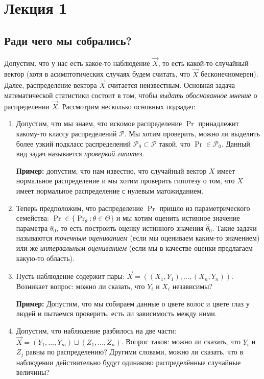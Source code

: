 \section{Лекция 1}
\subsection{Ради чего мы собрались?}
Допустим, что у нас есть какое-то наблюдение $\vec{X}$, то есть какой-то случайный вектор (хотя в асимптотических случаях будем считать, что $\vec{X}$ бесконечномерен). 
Далее, распределение вектора $\vec{X}$ считается неизвестным.
Основная задача математической статистики состоит в том, чтобы \emph{выдать обоснованное мнение} о распределении $\vec{X}$.
Рассмотрим несколько основных подзадач:
\begin{enumerate}[label=(\alph*)]
	\item Допустим, что мы знаем, что искомое распределение $\Pr$ принадлежит какому-то классу распределений $\mathcal{P}$.
	Мы хотим проверить, можно ли выделить более узкий подкласс распределений $\mathcal{P}_{0} \subset \mathcal{P}$ такой, что $\Pr \in \mathcal{P}_{0}$.
	Данный вид задач называется \emph{проверкой гипотез}.
	
	\textbf{Пример:} допустим, что нам известно, что случайный вектор $X$ имеет нормальное распределение и мы хотим проверить гипотезу о том, что $X$ имеет нормальное распределение с нулевым матожиданием.
	
	\item Теперь предположим, что распределение $\Pr$ пришло из параметрического семейства: $\Pr \in \{\Pr_{\theta}\colon \theta \in \Theta\}$ и мы хотим оценить истинное значение параметра $\theta_{0}$, то есть построить оценку истинного значения $\hat{\theta}_{0}$.
	Такие задачи называются \emph{точечным оцениванием} (если мы оцениваем каким-то значением) или же \emph{интервальным оцениванием} (если мы в качестве оценки предлагаем какую-то область).
	
	\item Пусть наблюдение содержит пары: $\vec{X} = ((X_{1}, Y_{1}), \ldots, (X_{n}, Y_{n}))$.
	Возникает вопрос: можно ли сказать, что $Y_{i}$ и $X_{i}$ независимы? 
	
	\textbf{Пример:} Допустим, что мы собираем данные о цвете волос и цвете глаз у людей и пытаемся проверить, есть ли зависимость между ними.
	
	\item Допустим, что наблюдение разбилось на две части: $\vec{X} = (Y_{1}, \ldots, Y_{m}) \sqcup (Z_{1}, \ldots, Z_{n})$.
	Вопрос таков: можно ли сказать, что $Y_{i}$ и $Z_{j}$ равны по распределению?
	Другими словами, можно ли сказать, что в наблюдении действительно будут одинаково распределённые случайные величины? 
\end{enumerate}

